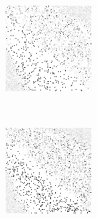 \begin{figure}
	\begin{subfigure}[t]{0.22\textwidth}
		\includegraphics[width=\textwidth]{images/findings/round1/strategies_cribminavg_pone.png}
		\caption{\cribminavg}
	\end{subfigure}
	~
	\begin{subfigure}[t]{0.22\textwidth}
		\includegraphics[width=\textwidth]{images/findings/round1/strategies_peggingmaxavggained_pone.png}

\end{subfigure}
\end{figure}

